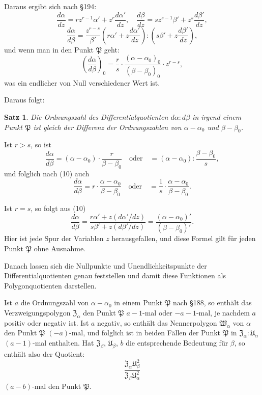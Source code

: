 \documentclass[12pt,a4paper]{article}
\newtheorem*{satz}{Satz}
\begin{document}
Daraus ergibt sich nach \S 194:
\begin{equation}\label{eq:195-9}
\frac{d\alpha}{dz} = rz^{r-1}\alpha' + z^r \frac{d\alpha'}{dz}, \quad \frac{d\beta}{dz} = sz^{s-1}\beta' + z^s \frac{d\beta'}{dz},
\end{equation}
\begin{equation}\label{eq:195-10}
\frac{d\alpha}{d\beta} = \frac{z^{r-s}}{\beta'}\left(r\alpha' + z\frac{d\alpha'}{dz}\right) : \left(s\beta' + z\frac{d\beta'}{dz}\right),
\end{equation}
und wenn man in den Punkt $\mathfrak{P}$ geht:
\begin{equation}\label{eq:195-11}
\left(\frac{d\alpha}{d\beta}\right)_0 = \frac{r}{s} \cdot \frac{(\alpha - \alpha_0)_0}{(\beta - \beta_0)_0} \cdot z^{r-s},
\end{equation}
was ein endlicher von Null verschiedener Wert ist.

Daraus folgt:
\begin{satz}
Die Ordnungszahl des Differentialquotienten $d\alpha:d\beta$ in irgend einem Punkt $\mathfrak{P}$ ist gleich der Differenz der Ordnungszahlen von $\alpha - \alpha_0$ und $\beta - \beta_0$.
\end{satz}

Ist $r > s$, so ist
\[
\frac{d\alpha}{d\beta} = (\alpha - \alpha_0) \cdot \frac{r}{\beta - \beta_0} \quad \text{oder} \quad = (\alpha - \alpha_0) : \frac{\beta - \beta_0}{s},
\]
und folglich nach (10) auch
\[
\frac{d\alpha}{d\beta} = r \cdot \frac{\alpha - \alpha_0}{\beta - \beta_0} \quad \text{oder} \quad = \frac{1}{s} \cdot \frac{\alpha - \alpha_0}{\beta - \beta_0}.
\]

Ist $r = s$, so folgt aus (10)
\begin{equation}\label{eq:195-12}
\frac{d\alpha}{d\beta} = \frac{r\alpha' + z(d\alpha'/dz)}{s\beta' + z(d\beta'/dz)} = \frac{(\alpha - \alpha_0)'}{(\beta - \beta_0)'}.
\end{equation}
Hier ist jede Spur der Variablen $z$ herausgefallen, und diese Formel gilt für jeden Punkt $\mathfrak{P}$ ohne Ausnahme.

Danach lassen sich die Nullpunkte und Unendlichkeitspunkte der Differentialquotienten genau feststellen und damit diese Funktionen als Polygonquotienten darstellen.

Ist $a$ die Ordnungszahl von $\alpha - \alpha_0$ in einem Punkt $\mathfrak{P}$ nach \S 188, so enthält das Verzweigungspolygon $\mathfrak{Z}_\alpha$ den Punkt $\mathfrak{P}$ $a-1$-mal oder $-a-1$-mal, je nachdem $a$ positiv oder negativ ist. Ist $a$ negativ, so enthält das Nennerpolygon $\mathfrak{W}_\alpha$ von $\alpha$ den Punkt $\mathfrak{P}$ $(-a)$-mal, und folglich ist in beiden Fällen der Punkt $\mathfrak{P}$ in $\mathfrak{Z}_\alpha : \mathfrak{U}_\alpha$ $(a-1)$-mal enthalten. Hat $\mathfrak{Z}_\beta$, $\mathfrak{U}_\beta$, $b$ die entsprechende Bedeutung für $\beta$, so enthält also der Quotient:
\[
\frac{\mathfrak{Z}_\alpha \mathfrak{U}_\beta^2}{\mathfrak{Z}_\beta \mathfrak{U}_\alpha^2}
\]
$(a-b)$-mal den Punkt $\mathfrak{P}$.
\end{document}
